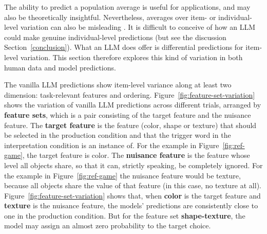 \documentclass{article}
\begin{document}
The ability to predict a population average is useful for applications, and may also be theoretically insightful.
Nevertheless, averages over item- or individual-level variation can also be misleading \citep[e.g.,][]{StanovichWest2000:Individual-diff,EstesMaddox2005:Risks-of-Drawin,HaafRouder2019:Some-do-and-som}.
It is difficult to conceive of how an LLM could make genuine individual-level predictions (but see the discussion Section~\ref{conclusion}).
What an LLM does offer is differential predictions for item-level variation.
This section therefore explores this kind of variation in both human data and model predictions.

The vanilla LLM predictions show item-level variance along at least two dimension: task-relevant features and ordering.
Figure~\ref{fig:feature-set-variation} shows the variation of vanilla LLM predictions across different trials, arranged by \textbf{feature sets}, which is a pair consisting of the target feature and the nuisance feature.
The \textbf{target feature} is the feature (color, shape or texture) that should be selected in the production condition and that the trigger word in the interpretation condition is an instance of.
For the example in Figure~\ref{fig:ref-game}, the target feature is color.
The \textbf{nuisance feature} is the feature whose level all objects share, so that it can, strictly speaking, be completely ignored.
For the example in Figure~\ref{fig:ref-game} the nuisance feature would be texture, because all objects share the value of that feature (in this case, no texture at all).
Figure~\ref{fig:feature-set-variation} shows that, when \textbf{color} is the target feature and \textbf{texture} is the nuisance feature, the models' predictions are consistently close to one in the production condition.
But for the feature set \textbf{shape-texture}, the model may assign an almost zero probability to the target choice.
\end{document}
